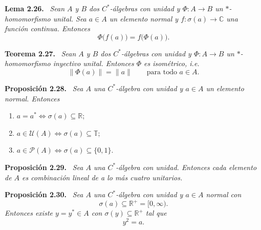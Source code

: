 \documentclass[11pt]{article}
\newcommand{\U}{\mathcal{U}}
\newcommand{\Pj}{\mathcal{P}}
\newcommand{\T}{\mathbb{T}}
\newenvironment{teorema}[1]
  {\par\medskip\noindent\textbf{Teorema #1.}\ \itshape}
  {\par\medskip}
\newenvironment{proposicion}[1]
  {\par\medskip\noindent\textbf{Proposición #1.}\ \itshape}
  {\par\medskip}
\newenvironment{lema}[1]
  {\par\medskip\noindent\textbf{Lema #1.}\ \itshape}
  {\par\medskip}
\begin{document}
\begin{lema}{2.26}
Sean $A$ y $B$ dos $C^*$-álgebras con unidad y $\Phi:A\to B$ un $*$-homomorfismo unital. Sea $a\in A$ un elemento normal y $f:\sigma(a)\to\mathbb{C}$ una función continua. Entonces
\[
  \Phi\bigl(f(a)\bigr)=f\bigl(\Phi(a)\bigr).
\]
\end{lema}

\begin{teorema}{2.27}
Sean $A$ y $B$ dos $C^*$-álgebras con unidad y $\Phi:A\to B$ un $*$-homomorfismo inyectivo unital. Entonces $\Phi$ es isométrico, i.e.
\[
  \lVert\Phi(a)\rVert=\lVert a\rVert
  \qquad\text{para todo }a\in A.
\]
\end{teorema}

\begin{proposicion}{2.28}
Sea $A$ una $C^*$-álgebra con unidad y $a\in A$ un elemento normal. Entonces
\begin{enumerate}[label=(\roman*),leftmargin=2.2em]
  \item $a=a^* \Longleftrightarrow \sigma(a)\subseteq\mathbb{R}$;
  \item $a\in\U(A) \Longleftrightarrow \sigma(a)\subseteq\T$;
  \item $a\in\Pj(A) \Longleftrightarrow \sigma(a)\subseteq\{0,1\}$.
\end{enumerate}
\end{proposicion}

\begin{proposicion}{2.29}
Sea $A$ una $C^*$-álgebra con unidad. Entonces cada elemento de $A$ es combinación lineal de a lo más cuatro unitarios.
\end{proposicion}

\begin{proposicion}{2.30}
Sea $A$ una $C^*$-álgebra con unidad y $a\in A$ normal con
\[
  \sigma(a)\subseteq\mathbb{R}^+=[0,\infty).
\]
Entonces existe $y=y^*\in A$ con $\sigma(y)\subseteq\mathbb{R}^+$ tal que
\[
  y^2=a.
\]
\end{proposicion}
\end{document}
